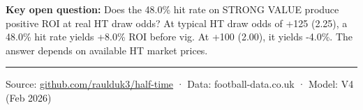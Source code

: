 \documentclass[11pt, letterpaper]{article}
\begin{document}
\vspace{8pt}
\noindent\colorbox{cardbg}{\parbox{\dimexpr\textwidth-2\fboxsep}{%
\color{accent}\textbf{Key open question:} Does the 48.0\% hit rate on STRONG VALUE produce positive ROI at real HT draw odds? At typical HT draw odds of +125 (2.25), a 48.0\% hit rate yields +8.0\% ROI before vig. At +100 (2.00), it yields -4.0\%. The answer depends on available HT market prices.}}

\vspace{16pt}
\noindent\rule{\textwidth}{0.4pt}
\begin{center}
\color{dimgray}\small
Source: \href{https://github.com/raulduk3/half-time}{github.com/raulduk3/half-time} · Data: football-data.co.uk · Model: V4 (Feb 2026)
\end{center}
\end{document}
